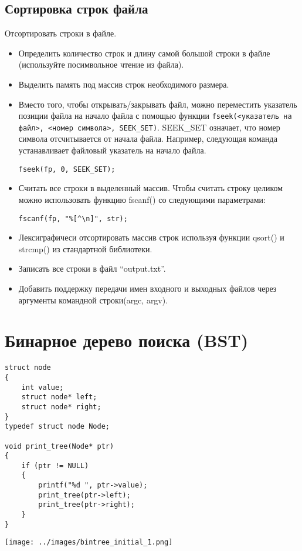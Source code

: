 \documentclass{article}
\begin{document}
\subsection*{Сортировка строк файла}
Отсортировать строки в файле.
\begin{itemize}
\item Определить количество строк и длину самой большой строки в файле (используйте посимвольное чтение из файла).
\item Выделить память под массив строк необходимого размера.
\item Вместо того, чтобы открывать/закрывать файл, можно переместить указатель позиции файла на начало файла с помощью функции \texttt{fseek(<указатель на файл>, <номер символа>, \texttt{SEEK\_SET})}. SEEK\_SET означает, что номер символа отсчитывается от начала файла. Например, следующая команда устанавливает файловый указатель на начало файла.
\begin{lstlisting}
fseek(fp, 0, SEEK_SET);
\end{lstlisting}
\item Считать все строки в выделенный массив. Чтобы считать строку целиком можно использовать функцию fscanf() со следующими параметрами:
\begin{lstlisting}
fscanf(fp, "%[^\n]", str);
\end{lstlisting}
\item Лексиграфичеси отсортировать массив строк используя функции qsort() и strcmp() из стандартной библиотеки.
\item Записать все строки в файл ``output.txt''.
\item Добавить поддержку передачи имен входного и выходных файлов через аргументы командной строки(argc, argv).
\end{itemize}

\newpage
\section*{Бинарное дерево поиска (BST)}
\begin{multicols}{2}
\begin{lstlisting}
struct node
{
    int value;
    struct node* left;
    struct node* right;
}
typedef struct node Node;

void print_tree(Node* ptr)
{
    if (ptr != NULL)
    {
        printf("%d ", ptr->value);
        print_tree(ptr->left);
        print_tree(ptr->right);
    }
}
\end{lstlisting}
\begin{center}
\texttt{[image: ../images/bintree\_initial\_1.png]}
\end{center}
\end{multicols}
\end{document}
